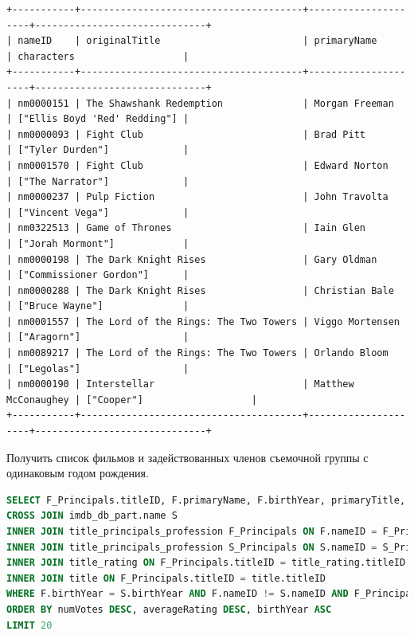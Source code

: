 \documentclass[12pt,a4paper]{article}
\begin{document}
\begin{lstlisting}[basicstyle = \tiny\ttfamily, columns = fixed]
+-----------+---------------------------------------+---------------------+------------------------------+
| nameID    | originalTitle                         | primaryName         | characters                   |
+-----------+---------------------------------------+---------------------+------------------------------+
| nm0000151 | The Shawshank Redemption              | Morgan Freeman      | ["Ellis Boyd 'Red' Redding"] |
| nm0000093 | Fight Club                            | Brad Pitt           | ["Tyler Durden"]             |
| nm0001570 | Fight Club                            | Edward Norton       | ["The Narrator"]             |
| nm0000237 | Pulp Fiction                          | John Travolta       | ["Vincent Vega"]             |
| nm0322513 | Game of Thrones                       | Iain Glen           | ["Jorah Mormont"]            |
| nm0000198 | The Dark Knight Rises                 | Gary Oldman         | ["Commissioner Gordon"]      |
| nm0000288 | The Dark Knight Rises                 | Christian Bale      | ["Bruce Wayne"]              |
| nm0001557 | The Lord of the Rings: The Two Towers | Viggo Mortensen     | ["Aragorn"]                  |
| nm0089217 | The Lord of the Rings: The Two Towers | Orlando Bloom       | ["Legolas"]                  |
| nm0000190 | Interstellar                          | Matthew McConaughey | ["Cooper"]                   |
+-----------+---------------------------------------+---------------------+------------------------------+
\end{lstlisting}

Получить список фильмов и задействованных членов съемочной группы с одинаковым годом рождения.

\begin{lstlisting}[language=SQL]
SELECT F_Principals.titleID, F.primaryName, F.birthYear, primaryTitle, numVotes, averageRating FROM imdb_db_part.name F
CROSS JOIN imdb_db_part.name S
INNER JOIN title_principals_profession F_Principals ON F.nameID = F_Principals.nameID
INNER JOIN title_principals_profession S_Principals ON S.nameID = S_Principals.nameID
INNER JOIN title_rating ON F_Principals.titleID = title_rating.titleID
INNER JOIN title ON F_Principals.titleID = title.titleID
WHERE F.birthYear = S.birthYear AND F.nameID != S.nameID AND F_Principals.titleID = S_Principals.titleID
ORDER BY numVotes DESC, averageRating DESC, birthYear ASC
LIMIT 20
\end{lstlisting}
\end{document}
